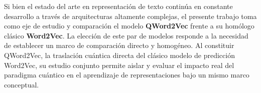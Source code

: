 Si bien el estado del arte en representación de texto continúa en constante desarrollo a través de arquitecturas altamente complejas, el presente trabajo toma como eje de estudio y comparación el modelo \textbf{QWord2Vec} frente a su homólogo clásico \textbf{Word2Vec}. La elección de este par de modelos responde a la necesidad de establecer un marco de comparación directo y homogéneo. Al constituir QWord2Vec, la traslación cuántica directa del clásico modelo de predicción Word2Vec, su estudio conjunto permite aislar y evaluar el impacto real del paradigma cuántico en el aprendizaje de representaciones bajo un mismo marco conceptual.


